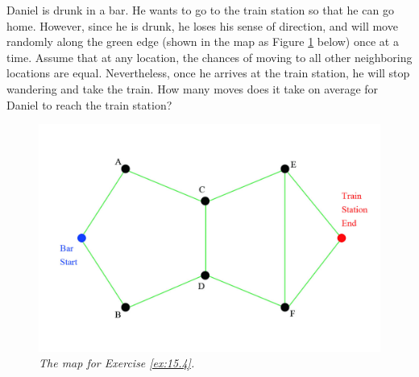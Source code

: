 \begin{Exercise}
\label{ex:15.4}
Daniel is drunk in a bar. He wants to go to the train station so that he can go home. However, since he is drunk, he loses his sense of direction, and will move randomly along the green edge (shown in the map as Figure \ref{fig:ex15.4} below) once at a time. Assume that at any location, the chances of moving to all other neighboring locations are equal. Nevertheless, once he arrives at the train station, he will stop wandering and take the train. How many moves does it take on average for Daniel to reach the train station?
\begin{figure}
    \centering
    \includegraphics[scale = 0.3]{graphics/wander.jpg}
    \caption{\textit{The map for Exercise \ref{ex:15.4}.}}
    \label{fig:ex15.4}
\end{figure}
\end{Exercise}
